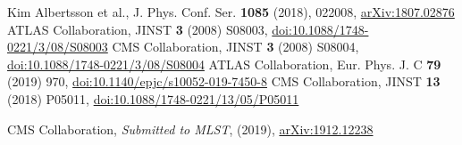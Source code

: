 \documentclass{webofc}
\begin{document}
\clearpage

\begin{thebibliography}{}
 Kim Albertsson et al., J. Phys. Conf. Ser. \textbf{1085} (2018), 022008, \href{http://www.arxiv.org/abs/1807.02876}{arXiv:1807.02876}
 ATLAS Collaboration, JINST \textbf{3} (2008) S08003, \href{http://dx.doi.org/10.1088/1748-0221/3/08/S08003}{doi:10.1088/1748-0221/3/08/S08003}
  CMS Collaboration, JINST \textbf{3} (2008) S08004,
\href{http://dx.doi.org/10.1088/1748-0221/3/08/S08004}{doi:10.1088/1748-0221/3/08/S08004}
 ATLAS Collaboration, Eur. Phys. J. C \textbf{79} (2019) 970, \href{http://dx.doi.org/10.1140/epjc/s10052-019-7450-8}{doi:10.1140/epjc/s10052-019-7450-8}
 CMS Collaboration, JINST \textbf{13} (2018) P05011,
\href{http://dx.doi.org/10.1088/1748-0221/13/05/P05011}{doi:10.1088/1748-0221/13/05/P05011}

 CMS Collaboration, \textit{Submitted to MLST}, (2019), \href{https://arxiv.org/abs/1912.12238}{arXiv:1912.12238}



\end{thebibliography}
\end{document}
